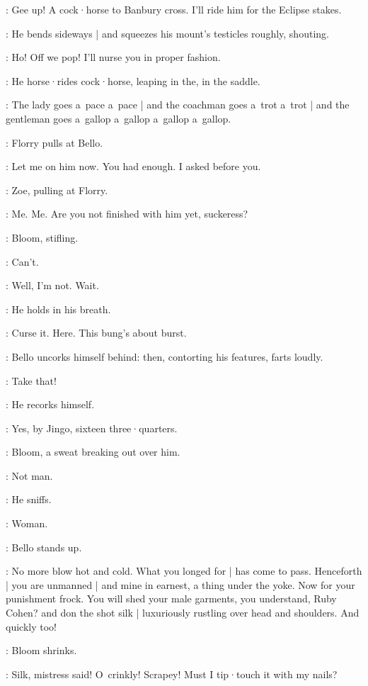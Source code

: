 \Bello:
Gee up!
A cock·horse to Banbury cross.
I'll ride him for the Eclipse stakes.

:
He bends sideways |
and squeezes his mount's testicles roughly,
shouting.

\Bello:
Ho!
Off we pop!
I'll nurse you in proper fashion.

:
He horse·rides cock·horse,
leaping in the,
in the saddle.

\Bello:
The lady goes a~pace a~pace |
and the coachman goes a~trot a~trot |
and the gentleman goes a~gallop a~gallop a~gallop a~gallop.

:
Florry pulls at Bello.%

\Florry:
Let me on him now.
You had enough.
I asked before you.

:
Zoe,
pulling at Florry.

\Zoe:
Me.
Me.
Are you not finished with him yet,
suckeress?

:
Bloom,
stifling.

\Bloom:
Can't.

\Bello:
Well,
I'm not.
Wait.

:
He holds in his breath.

\Bello:
Curse it.
Here.
This bung's about burst.

:
Bello uncorks himself behind:
then,
contorting his features,
farts loudly.

\Bello:
Take that!

:
He recorks himself.

\Bello:
Yes,
by Jingo,
sixteen three·quarters.%

:
Bloom,
a sweat breaking out over him.

\Bloom:
Not man.

:
He sniffs.

\Bloom:
Woman.

:
Bello stands up.

\Bello:
No more blow hot and cold.
What you longed for |
has come to pass.
Henceforth |
you are unmanned |
and mine in earnest,
a thing under the yoke.
Now for your punishment frock.
You will shed your male garments,
you understand,
Ruby Cohen?
and don the shot silk |
luxuriously rustling over head and shoulders.
And quickly too!

:
Bloom shrinks.

\Bloom:
Silk,
mistress said!
O~crinkly!
Scrapey!
Must I tip·touch it with my nails?

